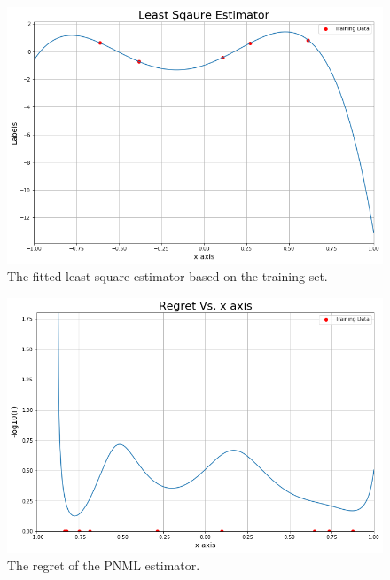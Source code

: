 \documentclass[letterpaper, 10 pt, conference]{ieeeconf}  %
\begin{document}
\begin{figure}[h] 
    \centering\includegraphics[width=\linewidth]{least_squares_plot.png}
    \caption{The fitted least square estimator based on the training set.}
    \label{fig:least_squares}
\end{figure}

\begin{figure}[h]
    \centering\includegraphics[width=\linewidth]{regret_plot.png}
    \caption{The regret of the PNML estimator.}
    \label{fig:regret}
\end{figure}
\end{document}
